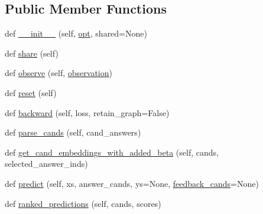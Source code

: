 \subsection*{Public Member Functions}
\begin{DoxyCompactItemize}
\item 
def \hyperlink{classprojects_1_1memnn__feedback_1_1agent_1_1memnn__feedback_1_1MemnnFeedbackAgent_a08f6869824b3663c1cb76206daa07942}{\+\_\+\+\_\+init\+\_\+\+\_\+} (self, \hyperlink{classprojects_1_1memnn__feedback_1_1agent_1_1memnn__feedback_1_1MemnnFeedbackAgent_a9aef833617afc1637860f936e9f375a9}{opt}, shared=None)
\item 
def \hyperlink{classprojects_1_1memnn__feedback_1_1agent_1_1memnn__feedback_1_1MemnnFeedbackAgent_a77c9550f6fa662fb4631150f391103b3}{share} (self)
\item 
def \hyperlink{classprojects_1_1memnn__feedback_1_1agent_1_1memnn__feedback_1_1MemnnFeedbackAgent_a2913695371d86863bcbc948505c3182f}{observe} (self, \hyperlink{classprojects_1_1memnn__feedback_1_1agent_1_1memnn__feedback_1_1MemnnFeedbackAgent_a096b4343510a89d11973b402879d54e4}{observation})
\item 
def \hyperlink{classprojects_1_1memnn__feedback_1_1agent_1_1memnn__feedback_1_1MemnnFeedbackAgent_a190948d766ed7c0fa025ec194ed1ff97}{reset} (self)
\item 
def \hyperlink{classprojects_1_1memnn__feedback_1_1agent_1_1memnn__feedback_1_1MemnnFeedbackAgent_a79db903bd9937e09ba96eee4ba9ceb6d}{backward} (self, loss, retain\+\_\+graph=False)
\item 
def \hyperlink{classprojects_1_1memnn__feedback_1_1agent_1_1memnn__feedback_1_1MemnnFeedbackAgent_a785f2bba986bca5cee12463a66b34889}{parse\+\_\+cands} (self, cand\+\_\+answers)
\item 
def \hyperlink{classprojects_1_1memnn__feedback_1_1agent_1_1memnn__feedback_1_1MemnnFeedbackAgent_a0da73c85ed6219edf8583a89a05eb8f2}{get\+\_\+cand\+\_\+embeddings\+\_\+with\+\_\+added\+\_\+beta} (self, cands, selected\+\_\+answer\+\_\+inds)
\item 
def \hyperlink{classprojects_1_1memnn__feedback_1_1agent_1_1memnn__feedback_1_1MemnnFeedbackAgent_a2e75fe3eda586069de1a2435ba7fae16}{predict} (self, xs, answer\+\_\+cands, ys=None, \hyperlink{classprojects_1_1memnn__feedback_1_1agent_1_1memnn__feedback_1_1MemnnFeedbackAgent_a28d975fb10cf1f644556b3a54df23b53}{feedback\+\_\+cands}=None)
\item 
def \hyperlink{classprojects_1_1memnn__feedback_1_1agent_1_1memnn__feedback_1_1MemnnFeedbackAgent_a1f4d9fba4c0ebf00025f328421a9af55}{ranked\+\_\+predictions} (self, cands, scores)

\end{DoxyCompactItemize}
